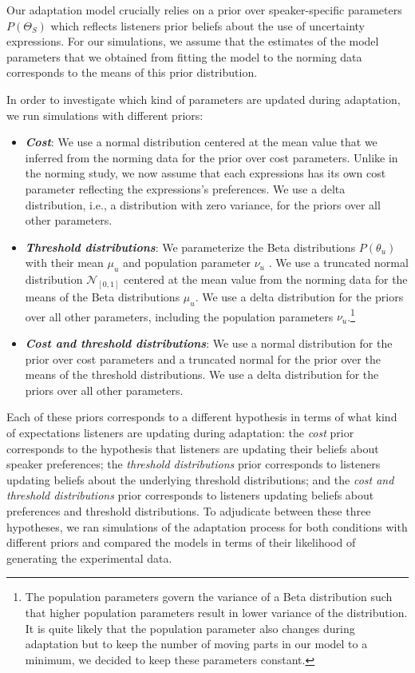 \documentclass[lucida,biblatex]{sp} %
\begin{document}
Our adaptation model crucially relies on a prior over speaker-specific parameters $P(\Theta_S)$
which reflects listeners prior beliefs about the use of uncertainty expressions. For our simulations,
we assume that the estimates of the model parameters that we obtained from fitting the model
to the norming data corresponds to the means of this prior distribution.

In order to investigate which kind of parameters are updated during adaptation, we run simulations
with different priors:

\begin{itemize}
\item \textbf{\textit{Cost}}: We use a normal distribution centered at the mean value that we inferred from the norming data for the prior over cost parameters. Unlike in the norming study, we now assume that each expressions has its own cost parameter reflecting the expressions's preferences. We use a delta distribution, i.e., a distribution with zero variance, for the priors over all other parameters.
\item \textbf{\textit{ Threshold distributions}}:  We parameterize the Beta distributions $P(\theta_u)$ with their mean $\mu_u$ and population parameter $\nu_u$ \citep{Kruschke2014}. We use a truncated normal distribution $\mathscr{N}_{[0,1]}$ centered at the mean value from the norming data for the means of the Beta distributions $\mu_u$. We use a delta distribution for the priors over all other parameters, including the population parameters $\nu_u$.\footnote{The population parameters govern the variance of a Beta distribution such that higher population parameters result in lower variance of the distribution. It is quite likely that the population parameter also changes during adaptation but to keep the number of moving parts in our model to a minimum, we decided to keep these parameters constant.}
\item \textbf{\textit{ Cost and threshold distributions}}: We use a normal distribution for the prior over cost parameters and a truncated normal for the prior over the means of the threshold distributions. We use a delta distribution for the priors over all other parameters.
\end{itemize}

Each of these priors corresponds to a different hypothesis in terms of what kind of expectations listeners are updating during adaptation: the {\it cost} prior corresponds to the hypothesis that listeners are updating their beliefs about speaker preferences; the {\it threshold distributions} prior corresponds to listeners updating beliefs about the underlying threshold distributions; and the {\it cost and threshold distributions} prior corresponds to listeners updating beliefs about preferences and threshold distributions. To adjudicate between these three hypotheses, we ran simulations of the adaptation process for both conditions with different priors and compared the models in terms of their likelihood of generating the experimental data.
\end{document}
